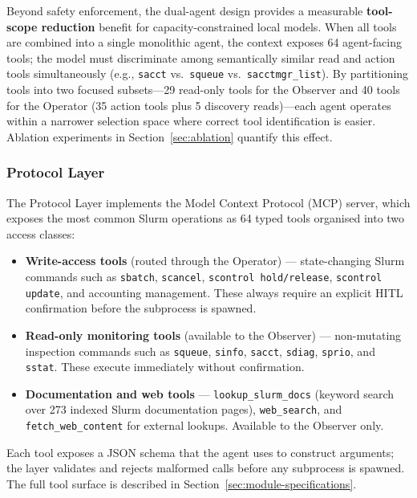 Beyond safety enforcement, the dual-agent design provides a measurable \textbf{tool-scope reduction} benefit for capacity-constrained local models. When all tools are combined into a single monolithic agent, the context exposes 64 agent-facing tools; the model must discriminate among semantically similar read and action tools simultaneously (e.g., \texttt{sacct} vs.\ \texttt{squeue} vs.\ \texttt{sacctmgr\_list}). By partitioning tools into two focused subsets---29 read-only tools for the Observer and 40 tools for the Operator (35 action tools plus 5 discovery reads)---each agent operates within a narrower selection space where correct tool identification is easier. Ablation experiments in Section~\ref{sec:ablation} quantify this effect.

\subsubsection{Protocol Layer}

The Protocol Layer implements the Model Context Protocol (MCP) server, which exposes the most common Slurm operations as 64 typed tools organised into two access classes:

\begin{itemize}
    \item \textbf{Write-access tools} (routed through the Operator) — state-changing Slurm commands such as \texttt{sbatch}, \texttt{scancel}, \texttt{scontrol hold/release}, \texttt{scontrol update}, and accounting management. These always require an explicit HITL confirmation before the subprocess is spawned.
    \item \textbf{Read-only monitoring tools} (available to the Observer) — non-mutating inspection commands such as \texttt{squeue}, \texttt{sinfo}, \texttt{sacct}, \texttt{sdiag}, \texttt{sprio}, and \texttt{sstat}. These execute immediately without confirmation.
    \item \textbf{Documentation and web tools} — \texttt{lookup\_slurm\_docs} (keyword search over 273 indexed Slurm documentation pages), \texttt{web\_search}, and \texttt{fetch\_web\_content} for external lookups. Available to the Observer only.
\end{itemize}

Each tool exposes a JSON schema that the agent uses to construct arguments; the layer validates and rejects malformed calls before any subprocess is spawned. The full tool surface is described in Section~\ref{sec:module-specifications}.

